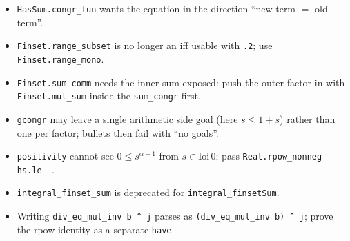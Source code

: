 \documentclass[11pt]{article}
\begin{document}
\begin{itemize}
\item \texttt{HasSum.congr\_fun} wants the equation in the direction ``new term $=$ old term''.
\item \texttt{Finset.range\_subset} is no longer an iff usable with \texttt{.2}; use
\texttt{Finset.range\_mono}.
\item \texttt{Finset.sum\_comm} needs the inner sum exposed: push the outer factor in with
\texttt{Finset.mul\_sum} inside the \texttt{sum\_congr} first.
\item \texttt{gcongr} may leave a single arithmetic side goal (here $s\le1+s$) rather than one per
factor; bullets then fail with ``no goals''.
\item \texttt{positivity} cannot see $0\le s^{\alpha-1}$ from $s\in\mathrm{Ioi}\,0$; pass
\texttt{Real.rpow\_nonneg hs.le \_}.
\item \texttt{integral\_finset\_sum} is deprecated for \texttt{integral\_finsetSum}.
\item Writing \texttt{div\_eq\_mul\_inv b \^{} j} parses as \texttt{(div\_eq\_mul\_inv b) \^{} j};
prove the rpow identity as a separate \texttt{have}.
\end{itemize}
\end{document}
